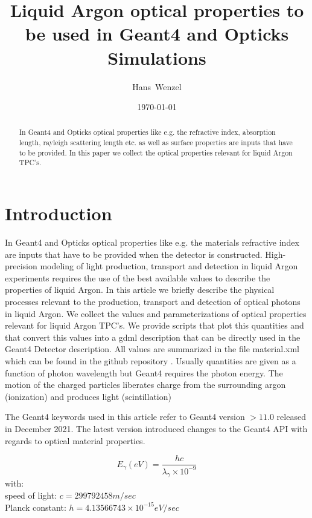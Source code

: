 \documentclass{article}
\title{Liquid Argon optical properties to be used in Geant4 and Opticks Simulations}
\date{\today}
\author{ Hans~Wenzel}
\affil[$^1$ ~Fermilab PO Box 500, Batavia, IL 60510,USA]
\begin{document}
\maketitle

\begin{abstract}
  In Geant4 and Opticks optical properties like e.g. the refractive
  index, absorption length, rayleigh scattering length etc. as well as surface properties are inputs that have to be provided.
  In this paper we collect the
  optical properties relevant for liquid Argon TPC's.   
\end{abstract}
\clearpage 
\tableofcontents
\clearpage
\section{Introduction}
  In Geant4 and Opticks optical properties like e.g. the materials refractive
  index are inputs that have to be provided when the detector is constructed.  High-precision modeling of 
  light production, transport and detection in liquid Argon  experiments requires the use of the best available values to describe the properties of liquid Argon.
In this article we briefly
  describe the physical processes relevant to the production, transport and detection of optical photons in liquid Argon.
  We collect the
  values and parameterizations of optical properties relevant for liquid Argon TPC's. We provide scripts that plot this quantities and that convert this values
  into a gdml description that can be directly used in the Geant4 Detector description.
  All values are summarized in the file material.xml which can be found in the github repository \cite{ref:scripts}.
  Usually quantities are given as a function of photon wavelength but Geant4 requires the photon energy.
  The motion of the charged particles liberates
charge from the surrounding argon (ionization) and
produces light (scintillation)

 The Geant4 keywords used in this article refer to Geant4 version $ > 11.0$ released in December 2021. The latest version introduced changes to the Geant4 API with regards to optical material properties. 


\begin{equation}
  E_{\gamma}(eV) = \frac{h  c}{\lambda_{\gamma} \times  10^{-9}}
  \label{equ:equation1}
\end{equation}
\noindent
    with:\\
  speed of light: $c = 299792458 m/sec$\\
  Planck constant: $h = 4.13566743\times10^{-15} eV/sec$\\
  \clearpage
\end{document}

